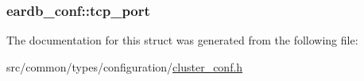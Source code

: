 \subsubsection[{\texorpdfstring{tcp\+\_\+port}{tcp_port}}]{ eardb\+\_\+conf\+::tcp\+\_\+port}\hypertarget{structeardb__conf_af4823cf78232f931cc656abcaa419422}{}\label{structeardb__conf_af4823cf78232f931cc656abcaa419422}


The documentation for this struct was generated from the following file\+:\begin{DoxyCompactItemize}
\item 
src/common/types/configuration/\hyperlink{cluster__conf_8h}{cluster\+\_\+conf.\+h}\end{DoxyCompactItemize}
